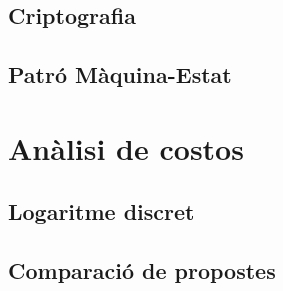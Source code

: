 \documentclass{beamer}
\begin{document}
\subsection{Criptografia}
\subsection{Patró Màquina-Estat}
\section{Anàlisi de costos}
\subsection{Logaritme discret}
\subsection{Comparació de propostes}
\begin{frame}[allowframebreaks]
	
\end{frame}
\end{document}
